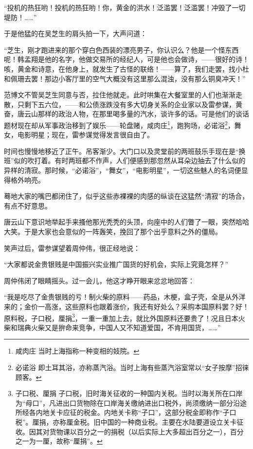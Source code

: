 \par “投机的热狂哟！投机的热狂哟！你，黄金的洪水！泛滥罢！泛滥罢！冲毁了一切堤防！……”
\par 于是他猛的在吴芝生的肩头拍一下，大声问道：
\par “芝生，刚才跑进来的那个穿白色西装的漂亮男子，你认识么？他是一个怪东西呢！韩孟翔是他的名字，他做交易所的经纪人，可是他也会做诗，——很好的诗！咳，黄金和诗意，在他身上，就发生了古怪的联络！——算了，我们走罢，找小杜和佩珊去罢！那边小客厅里的空气大概没有这里那么混浊，没有那么铜臭冲天！”
\par 范博文不管吴芝生同意与否，拉住他就走。此时哄集在大餐室里的人们也渐渐走散，只剩下五六位，——和公债涨跌没有多大切身关系的企业家以及雷参谋，黄奋，唐云山那样的政治人物，在那里喝多量的汽水，谈许多的话。可是他们的谈话题材现在却从军事政治移到了娱乐——轮盘赌，咸肉庄\footnote{咸肉庄 当时上海指称一种变相的妓院。}，跑狗场，必诺浴\footnote{必诺浴 即土耳其浴，亦称蒸汽浴。当时上海有些蒸汽浴室常以“女子按摩”招徕顾客。}，舞女，电影明星；现在，雷参谋觉得发言很自由了。
\par 时间也慢慢地移近了正午。吊客渐少。大门口以及灵堂前的两班鼓乐手现在是“换班”似的吹打着。有时两班都不作声，人们便感到那忽然从耳朵边抽去了什么似的异样的清寂。那时候，“必诺浴”，“舞女”，“电影明星”，一切这些魅人的名词便显得格外响亮。
\par 蓦地大家的嘴巴都闭住了，似乎这些赤裸裸的肉感的纵谈在这猛然“清寂”的场合，有点不好意思。
\par 唐云山下意识地举起手来搔他那光秃秃的头顶，向座中的人们瞥了一眼，突然哈哈大笑。于是大家也会意似的一阵轰笑，挽回了那个出乎意料之外的僵局。
\par 笑声过后，雷参谋望着周仲伟，很正经地说：
\par “大家都说金贵银贱是中国振兴实业推广国货的好机会，实际上究竟怎样？”
\par 周仲伟闭了眼睛摇头。过一会儿，他这才睁开眼来忿忿地回答：
\par “我是吃尽了金贵银贱的亏！制火柴的原料——药品，木梗，盒子壳，全是从外洋来的；金价一高涨，这些原料也跟着涨价，我还有好处么？采购本国原料罢？好！原料税，子口税，厘捐\footnote{子口税、厘捐 子口税，旧时海关征收的一种国内关税。当时以海关所在口岸为“母口”，凡进出口货物除在口岸海关缴纳进出口税外，尚须缴纳一部分沿途所经各内地关卡应征的税金。内地关卡称“子口”，这部分税金即称作“子口税”。厘捐，亦称厘金税。旧中国的一种商业税。主要在水陆要道设立关卡征收。因其对货物课以百分之一的捐税（以后实际上大多超出百分之一），百分之一为一厘，故称“厘捐”。}，一重一重加上去，就比外国原料还要贵了！况且日本火柴和瑞典火柴又是拚命来竞争，中国人又不知道爱国，不肯用国货，……”
